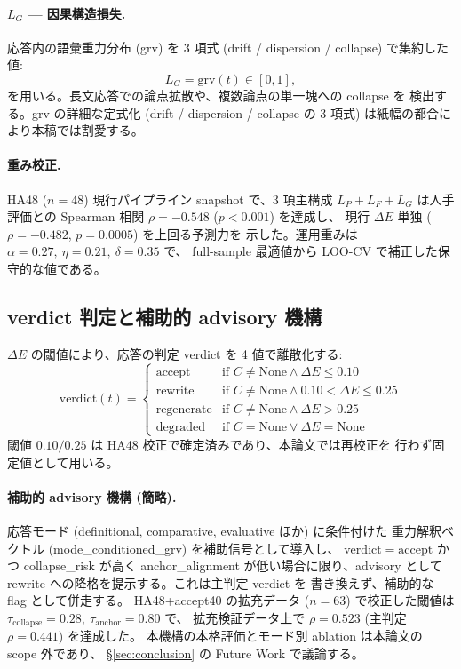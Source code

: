\paragraph{$L_G$ — 因果構造損失.} 応答内の語彙重力分布 (grv) を
3 項式 (drift / dispersion / collapse) で集約した値:
\begin{equation}
L_G = \mathrm{grv}(t) \in [0, 1],
\end{equation}
を用いる。長文応答での論点拡散や、複数論点の単一塊への collapse を
検出する。grv の詳細な定式化 (drift / dispersion / collapse の 3 項式)
は紙幅の都合により本稿では割愛する。

\paragraph{重み校正.}
HA48 ($n = 48$) 現行パイプライン snapshot で、3 項主構成 $L_P + L_F + L_G$
は人手評価との Spearman 相関 $\rho = -0.548$ ($p < 0.001$) を達成し、
現行 $\Delta E$ 単独 ($\rho = -0.482$, $p = 0.0005$) を上回る予測力を
示した。運用重みは $\alpha = 0.27,\ \eta = 0.21,\ \delta = 0.35$ で、
full-sample 最適値から LOO-CV で補正した保守的な値である。

\subsection{verdict 判定と補助的 advisory 機構}
\label{sec:method:verdict}

$\Delta E$ の閾値により、応答の判定 verdict を 4 値で離散化する:
\begin{equation}
\mathrm{verdict}(t) =
\begin{cases}
\mathrm{accept}     & \text{if } C \neq \mathrm{None} \land \Delta E \leq 0.10 \\
\mathrm{rewrite}    & \text{if } C \neq \mathrm{None} \land 0.10 < \Delta E \leq 0.25 \\
\mathrm{regenerate} & \text{if } C \neq \mathrm{None} \land \Delta E > 0.25 \\
\mathrm{degraded}   & \text{if } C = \mathrm{None} \lor \Delta E = \mathrm{None}
\end{cases}
\end{equation}
閾値 $0.10 / 0.25$ は HA48 校正で確定済みであり、本論文では再校正を
行わず固定値として用いる。

\paragraph{補助的 advisory 機構 (簡略).}
応答モード (definitional, comparative, evaluative ほか) に条件付けた
重力解釈ベクトル (mode\_conditioned\_grv) を補助信号として導入し、
$\mathrm{verdict} = \mathrm{accept}$ かつ collapse\_risk が高く
anchor\_alignment が低い場合に限り、advisory として
$\mathrm{rewrite}$ への降格を提示する。これは主判定 verdict を
書き換えず、補助的な flag として併走する。
HA48+accept40 の拡充データ ($n = 63$) で校正した閾値は
$\tau_{\mathrm{collapse}} = 0.28,\ \tau_{\mathrm{anchor}} = 0.80$ で、
拡充検証データ上で $\rho = 0.523$ (主判定 $\rho = 0.441$) を達成した。
本機構の本格評価とモード別 ablation は本論文の scope 外であり、
\S\ref{sec:conclusion} の Future Work で議論する。
